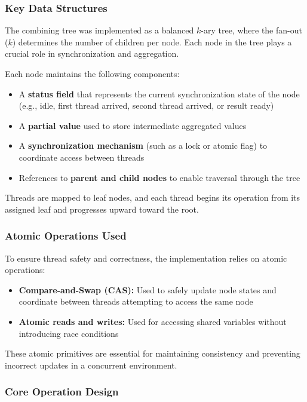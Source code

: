 \documentclass[11pt,a4paper]{article}
\begin{document}
\subsubsection*{Key Data Structures}

The combining tree was implemented as a balanced $k$-ary tree, where the fan-out ($k$) determines the number of children per node. Each node in the tree plays a crucial role in synchronization and aggregation.

Each node maintains the following components:
\begin{itemize}
    \item A \textbf{status field} that represents the current synchronization state of the node (e.g., idle, first thread arrived, second thread arrived, or result ready)
    \item A \textbf{partial value} used to store intermediate aggregated values
    \item A \textbf{synchronization mechanism} (such as a lock or atomic flag) to coordinate access between threads
    \item References to \textbf{parent and child nodes} to enable traversal through the tree
\end{itemize}
Threads are mapped to leaf nodes, and each thread begins its operation from its assigned leaf and progresses upward toward the root.

\subsubsection*{Atomic Operations Used}

To ensure thread safety and correctness, the implementation relies on atomic operations:

\begin{itemize}
    \item \textbf{Compare-and-Swap (CAS):} Used to safely update node states and coordinate between threads attempting to access the same node
    \item \textbf{Atomic reads and writes:} Used for accessing shared variables without introducing race conditions
\end{itemize}
These atomic primitives are essential for maintaining consistency and preventing incorrect updates in a concurrent environment.

\subsubsection*{Core Operation Design}
\end{document}
